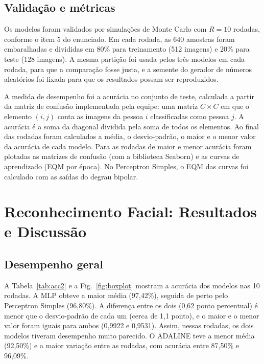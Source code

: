 \documentclass[conference]{IEEEtran}
\begin{document}
\subsection{Validação e métricas}

Os modelos foram validados por simulações de Monte Carlo com $R = 10$
rodadas, conforme o item 5 do enunciado. Em cada rodada, as 640 amostras
foram embaralhadas e divididas em 80\% para treinamento (512 imagens) e
20\% para teste (128 imagens). A mesma partição foi usada pelos três
modelos em cada rodada, para que a comparação fosse justa, e a semente do
gerador de números aleatórios foi fixada para que os resultados possam ser
reproduzidos.

A medida de desempenho foi a acurácia no conjunto de teste, calculada a
partir da matriz de confusão implementada pela equipe: uma matriz
$C \times C$ em que o elemento $(i, j)$ conta as imagens da pessoa $i$
classificadas como pessoa $j$. A acurácia é a soma da diagonal dividida
pela soma de todos os elementos. Ao final das rodadas foram calculados a
média, o desvio-padrão, o maior e o menor valor da acurácia de cada modelo.
Para as rodadas de maior e menor acurácia foram plotadas as matrizes de
confusão (com a biblioteca Seaborn) e as curvas de aprendizado (EQM por
época). No Perceptron Simples, o EQM das curvas foi calculado com as saídas
do degrau bipolar.

\section{Reconhecimento Facial: Resultados e Discussão}\label{sec:res2}

\subsection{Desempenho geral}

A Tabela~\ref{tab:acc2} e a Fig.~\ref{fig:boxplot} mostram a acurácia dos
modelos nas 10 rodadas. A MLP obteve a maior média (97,42\%), seguida de
perto pelo Perceptron Simples (96,80\%). A diferença entre os dois (0,62
ponto percentual) é menor que o desvio-padrão de cada um (cerca de 1,1
ponto), e o maior e o menor valor foram iguais para ambos (0,9922 e
0,9531). Assim, nessas rodadas, os dois modelos tiveram desempenho muito
parecido. O ADALINE teve a menor média (92,50\%) e a maior variação entre
as rodadas, com acurácia entre 87,50\% e 96,09\%.
\end{document}
